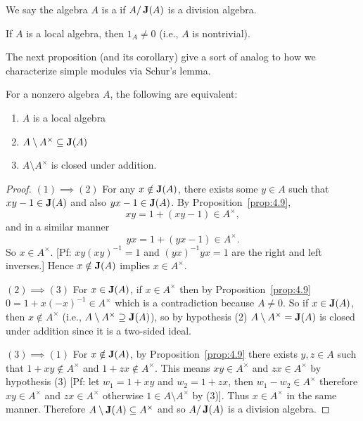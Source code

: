 \begin{definition}
We say the algebra $A$ is a  if $A/\operatorname{\textup{\textbf{J}}}(A)$
is a division algebra.
\end{definition}

\begin{node}
If $A$ is a local algebra, then $1_{A}\neq0$ (i.e., $A$ is nontrivial).
\end{node}

\begin{node}
The next proposition (and its corollary) give a sort of analog to
how we characterize simple modules via Schur's lemma.
\end{node}

\begin{proposition}\label{prop:5.2}
For a nonzero algebra $A$, the following are equivalent:
\begin{enumerate}
\item $A$ is a local algebra
\item $A\setminus A^{\times}\subseteq\operatorname{\textup{\textbf{J}}}(A)$
\item $A\setminus A^{\times}$ is closed under addition.
\end{enumerate}
\end{proposition}

\begin{proof}
$(1)\implies(2)$ For any $x\notin\operatorname{\textup{\textbf{J}}}(A)$, there exists some
$y\in A$ such that $xy-1\in\operatorname{\textup{\textbf{J}}}(A)$ and also $yx-1\in\operatorname{\textup{\textbf{J}}}(A)$.
By Proposition~\ref{prop:4.9},
\begin{equation}
xy=1+(xy-1)\in A^{\times},
\end{equation}
and in a similar manner
\begin{equation}
yx=1+(yx-1)\in A^{\times}.
\end{equation}
So $x\in A^{\times}$. [Pf: $xy(xy)^{-1}=1$ and $(yx)^{-1}yx=1$ are the
right and left inverses.] Hence $x\notin\operatorname{\textup{\textbf{J}}}(A)$ implies $x\in A^{\times}$.

\bigbreak
$(2)\implies(3)$ For $x\in\operatorname{\textup{\textbf{J}}}(A)$, if $x\in A^{\times}$ then by
Proposition~\ref{prop:4.9} $0=1+x(-x)^{-1}\in A^{\times}$ which is a
contradiction because $A\neq0$. So if $x\in\operatorname{\textup{\textbf{J}}}(A)$, then
$x\notin A^{\times}$ (i.e., $A\setminus A^{\times}\supseteq\operatorname{\textup{\textbf{J}}}(A)$),
so by hypothesis (2) $A\setminus A^{\times}=\operatorname{\textup{\textbf{J}}}(A)$ is closed
under addition since it is a two-sided ideal.

\bigbreak$(3)\implies(1)$
For $x\notin\operatorname{\textup{\textbf{J}}}(A)$, by Proposition~\ref{prop:4.9} there exists
$y,z\in A$ such that $1+xy\notin A^{\times}$ and $1+zx\notin A^{\times}$.
This means $xy\in A^{\times}$ and $zx\in A^{\times}$ by hypothesis (3)
[Pf: let $w_{1}=1+xy$ and $w_{2}=1+zx$, then $w_{1}-w_{2}\in A^{\times}$
therefore $xy\in A^{\times}$ and $zx\in A^{\times}$ otherwise $1\in A\setminus A^{\times}$ by (3)].
Thus $x\in A^{\times}$ in the same manner. Therefore
$A\setminus\operatorname{\textup{\textbf{J}}}(A)\subseteq A^{\times}$ and so $A/\operatorname{\textup{\textbf{J}}}(A)$ is
a division algebra.
\end{proof}


